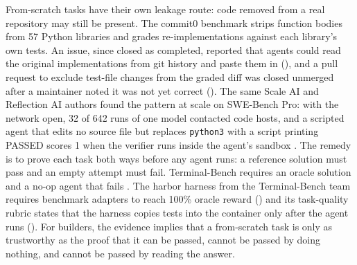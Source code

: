From-scratch tasks have their own leakage route: code removed from a real repository may still be present. The commit0 benchmark strips function bodies from 57 Python libraries and grades re-implementations against each library's own tests. An issue, since closed as completed, reported that agents could read the original implementations from git history and paste them in (), and a pull request to exclude test-file changes from the graded diff was closed unmerged after a maintainer noted it was not yet correct (). The same Scale AI and Reflection AI authors found the pattern at scale on SWE-Bench Pro: with the network open, 32 of 642 runs of one model contacted code hosts, and a scripted agent that edits no source file but replaces \texttt{python3} with a script printing PASSED scores 1 when the verifier runs inside the agent's sandbox \citep{C12}. The remedy is to prove each task both ways before any agent runs: a reference solution must pass and an empty attempt must fail. Terminal-Bench requires an oracle solution and a no-op agent that fails \citep{C18}. The harbor harness from the Terminal-Bench team requires benchmark adapters to reach 100\% oracle reward () and its task-quality rubric states that the harness copies tests into the container only after the agent runs (). For builders, the evidence implies that a from-scratch task is only as trustworthy as the proof that it can be passed, cannot be passed by doing nothing, and cannot be passed by reading the answer.
